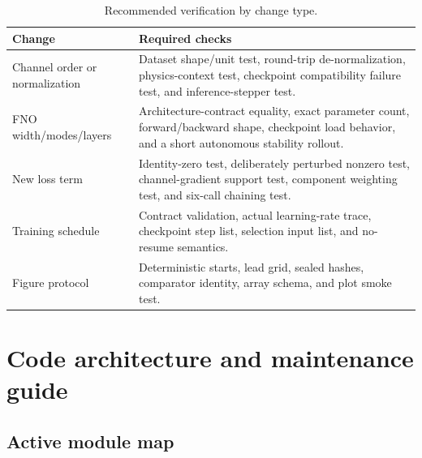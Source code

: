 \documentclass[11pt,oneside]{report}
\begin{document}
\begin{table}[H]
\centering
\caption{Recommended verification by change type.}
\begin{tabularx}{\textwidth}{@{}lX@{}}
\toprule
Change & Required checks \\
\midrule
Channel order or normalization &
Dataset shape/unit test, round-trip de-normalization, physics-context test,
checkpoint compatibility failure test, and inference-stepper test. \\
FNO width/modes/layers &
Architecture-contract equality, exact parameter count, forward/backward shape,
checkpoint load behavior, and a short autonomous stability rollout. \\
New loss term &
Identity-zero test, deliberately perturbed nonzero test, channel-gradient
support test, component weighting test, and six-call chaining test. \\
Training schedule &
Contract validation, actual learning-rate trace, checkpoint step list,
selection input list, and no-resume semantics. \\
Figure protocol &
Deterministic starts, lead grid, sealed hashes, comparator identity, array
schema, and plot smoke test. \\
\bottomrule
\end{tabularx}
\end{table}

\chapter{Code architecture and maintenance guide}
\label{ch:maintenance}

\section{Active module map}
\end{document}
